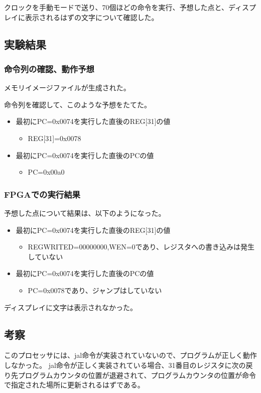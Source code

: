 クロックを手動モードで送り、70個ほどの命令を実行、予想した点と、ディスプレイに表示されるはずの文字について確認した。

\subsection{実験結果}
\subsubsection{命令列の確認、動作予想}
メモリイメージファイルが生成された。
% 

命令列を確認して、このような予想をたてた。
\begin{itemize}
  \item 最初にPC=0x0074を実行した直後のREG[31]の値
  \begin{itemize}
    \item REG[31]=0x0078
  \end{itemize}
  \item 最初にPC=0x0074を実行した直後のPCの値
  \begin{itemize}
    \item PC=0x00a0
  \end{itemize}
\end{itemize}

\subsubsection{FPGAでの実行結果}
予想した点について結果は、以下のようになった。
\begin{itemize}
  \item 最初にPC=0x0074を実行した直後のREG[31]の値
  \begin{itemize}
    \item REGWRITED=00000000,WEN=0であり、レジスタへの書き込みは発生していない
  \end{itemize}
  \item 最初にPC=0x0074を実行した直後のPCの値
  \begin{itemize}
    \item PC=0x0078であり、ジャンプはしていない
  \end{itemize}
\end{itemize}

ディスプレイに文字は表示されなかった。

\subsection{考察}
このプロセッサには、jal命令が実装されていないので、プログラムが正しく動作しなかった。
jal命令が正しく実装されている場合、31番目のレジスタに次の戻り先プログラムカウンタの位置が退避されて、プログラムカウンタの位置が命令で指定された場所に更新されるはずである。
